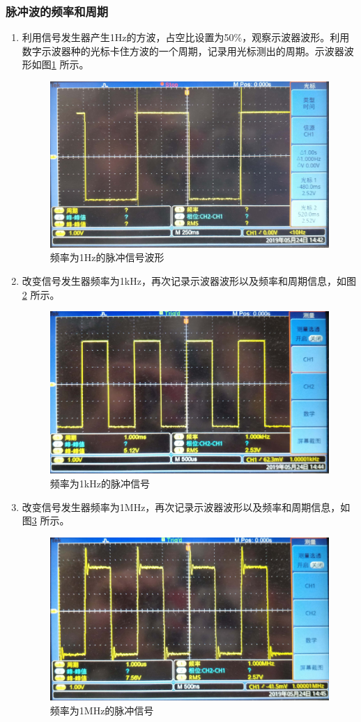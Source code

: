 \documentclass[12pt]{article}
\begin{document}
\subsubsection{脉冲波的频率和周期}
\begin{enumerate}
  \item 利用信号发生器产生1Hz的方波，占空比设置为50\%，观察示波器波形。利用数字示波器种的光标卡住方波的一个周期，记录用光标测出的周期。示波器波形如图\ref{mc1hz}
  所示。
  \begin{figure}[htbp]
    \centering
    \includegraphics[width=.5\textwidth]{P013}
    \caption{频率为1Hz的脉冲信号波形}\label{mc1hz}
  \end{figure}
\item 改变信号发生器频率为1kHz，再次记录示波器波形以及频率和周期信息，如图\ref{mc1khz}
所示。
  \begin{figure}[htbp]
    \centering
    \includegraphics[width=.5\textwidth]{P017}
    \caption{频率为1kHz的脉冲信号}\label{mc1khz}
  \end{figure}
\item 改变信号发生器频率为1MHz，再次记录示波器波形以及频率和周期信息，如图\ref{mc1mhz}
所示。
  \begin{figure}[htbp]
    \centering
    \includegraphics[width=.5\textwidth]{P027}
    \caption{频率为1MHz的脉冲信号}\label{mc1mhz}
  \end{figure}
\end{enumerate}
\end{document}
